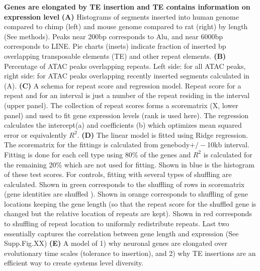 \textbf{Genes are elongated by TE insertion and TE contains information on expression level}
\textbf{(A)} Histograms of segments inserted into human genome compared to chimp (left) and mouse genome compared to rat (right) by length (See methods). Peaks near 200bp corresponds to Alu, and near 6000bp corresponds to LINE. Pie charts (insets) indicate fraction of inserted bp overlapping transposable elements (TE) and other repeat elements.
\textbf{(B)} Percentage of ATAC peaks overlapping repeats. Left side: for all ATAC peaks, right side: for ATAC peaks overlapping recently inserted segments calculated in (A). 
\textbf{(C)} A schema for repeat score and regression model. Repeat score for a repeat and for an interval is just a number of the repeat residing in the interval (upper panel). The collection of repeat scores forms a scorematrix (X, lower panel) and used to fit gene expression levels (rank is used here). The regression calculates the intercept(a) and coefficients (b) which optimizes mean squared error or equivalently $R^2$. 
\textbf{(D)} The linear model is fitted using Ridge regression. The scorematrix for the fittings is calculated from genebody$+/-$10kb interval. Fitting is done for each cell type using 80\% of the genes and $R^2$ is calculated for the remaining 20\% which are not used for fitting. Shown in blue is the histogram of these test scores. For controls, fitting with several types of shuffling are calculated. Shown in green corresponds to the shuffling of rows in scorematrix (gene identities are shuffled ). Shown in orange corresponds to shuffling of gene locations keeping the gene length (so that the repeat score for the shuffled gene is changed but the relative location of repeats are kept). Shown in red corresponds to shuffling of repeat location to uniformly redistribute repeats. Last two essentially captures the correlation between gene length and expression (See Supp.Fig.XX)
\textbf{(E)} A model of 1) why neuronal genes are elongated over evolutionary time scales (tolerance to insertion), and 2) why TE insertions are an efficient way to create systems level diversity. 
